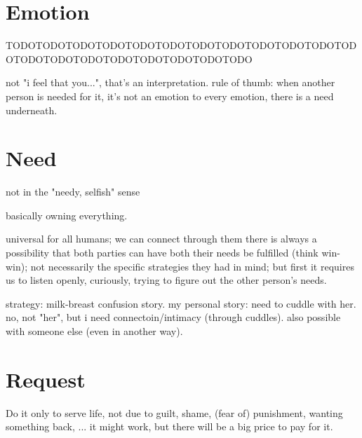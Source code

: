 \section{Emotion}\label{sec:emotion}

TODOTODOTODOTODOTODOTODOTODOTODOTODOTODOTODOTODOTODOTODOTODOTODOTODOTODOTODOTODO

not "i feel that you...", that's an interpretation.
rule of thumb: when another person is needed for it, it's not an emotion
to every emotion, there is a need underneath.


\section{Need}\label{sec:need}


not in the "needy, selfish" sense

basically owning everything.

universal for all humans; we can connect through them
there is always a possibility that both parties can have both their needs be fulfilled (think win-win); not necessarily the specific strategies they had in mind; but first it requires us to listen openly, curiously, trying to figure out the other person's needs.

strategy: milk-breast confusion story.
my personal story: need to cuddle with her. no, not "her", but i need connectoin/intimacy (through cuddles). also possible with someone else (even in another way).

\section{Request}\label{sec:request}

Do it only to serve life, not due to guilt, shame, (fear of) punishment, wanting something back, ... it might work, but there will be a big price to pay for it.

